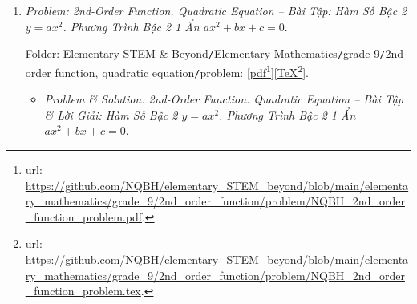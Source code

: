 \documentclass[12pt]{article}
\begin{document}
\begin{enumerate}
\begin{itemize}
		Folder: {\sf Elementary STEM \& Beyond{\tt/}Elementary Mathematics{\tt/}grade 9{\tt/}probability \& statistics{\tt/}solution}: [\href{https://github.com/NQBH/elementary_STEM_beyond/blob/main/elementary_mathematics/grade_9/probability_statistics/solution/NQBH_probability_statistics_solution.pdf}{pdf}\footnote{{\sc url}: \url{https://github.com/NQBH/elementary_STEM_beyond/blob/main/elementary_mathematics/grade_9/probability_statistics/solution/NQBH_probability_statistics_solution.pdf}.}][\href{https://github.com/NQBH/elementary_STEM_beyond/blob/main/elementary_mathematics/grade_9/probability_statistics/solution/NQBH_probability_statistics_solution.tex}{\TeX}\footnote{{\sc url}: \url{https://github.com/NQBH/elementary_STEM_beyond/blob/main/elementary_mathematics/grade_9/probability_statistics/solution/NQBH_probability_statistics_solution.tex}.}].
	\end{itemize}
	\item {\it Problem: 2nd-Order Function. Quadratic Equation -- Bài Tập: Hàm Số Bậc 2 $y = ax^2$. Phương Trình Bậc 2 1 Ẩn $ax^2 + bx + c = 0$}.
	
	Folder: {\sf Elementary STEM \& Beyond{\tt/}Elementary Mathematics{\tt/}grade 9{\tt/}2nd-order function, quadratic equation{\tt/}problem}: [\href{https://github.com/NQBH/elementary_STEM_beyond/blob/main/elementary_mathematics/grade_9/2nd_order_function/problem/NQBH_2nd_order_function_problem.pdf}{pdf}\footnote{{\sc url}: \url{https://github.com/NQBH/elementary_STEM_beyond/blob/main/elementary_mathematics/grade_9/2nd_order_function/problem/NQBH_2nd_order_function_problem.pdf}.}][\href{https://github.com/NQBH/elementary_STEM_beyond/blob/main/elementary_mathematics/grade_9/2nd_order_function/problem/NQBH_2nd_order_function_problem.tex}{\TeX}\footnote{{\sc url}: \url{https://github.com/NQBH/elementary_STEM_beyond/blob/main/elementary_mathematics/grade_9/2nd_order_function/problem/NQBH_2nd_order_function_problem.tex}.}].
	\begin{itemize}
		\item {\it Problem \& Solution: 2nd-Order Function. Quadratic Equation -- Bài Tập \& Lời Giải: Hàm Số Bậc 2 $y = ax^2$. Phương Trình Bậc 2 1 Ẩn $ax^2 + bx + c = 0$}.
		

\end{itemize}
\end{enumerate}
\end{document}
